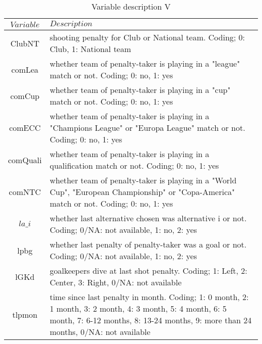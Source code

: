 \documentclass[12pt,dvipsnames]{article}%
\begin{document}
 \begin{table}[h]
\caption{Variable description \small{V}}
\centering
\begin{tabular}{ c | p{12cm}  }
    $Variable$ & $Description$   \\
   \hline 

 ClubNT & shooting penalty for Club or National team. Coding; 0: Club, 1: National team  \\

comLea & whether team of penalty-taker is playing in a "league" match or not. Coding; 0: no, 1: yes \\

comCup & whether team of penalty-taker is playing in a "cup" match or not. Coding; 0: no, 1: yes \\

comECC & whether team of penalty-taker is playing in a "Champions League" or "Europa League" match or not. Coding; 0: no, 1: yes \\

comQuali & whether team of penalty-taker is playing in a qualification match or not. Coding; 0: no, 1: yes \\

comNTC & whether team of penalty-taker is playing in a "World Cup", "European Championship" or "Copa-America" match or not. Coding; 0: no, 1: yes \\

$la\_i$ & whether last alternative chosen was alternative i or not. Coding; 0/NA: not available, 1: no, 2: yes  \\

lpbg & whether last penalty of penalty-taker was a goal or not. Coding; 0/NA: not available, 1: no, 2: yes \\

lGKd & goalkeepers dive at last shot penalty. Coding; 1: Left, 2: Center, 3: Right, 0/NA: not available \\

tlpmon & time since last penalty in month. Coding; 1: 0 month, 2: 1 month, 3: 2 month, 4: 3 month, 5: 4 month, 6: 5 month, 7: 6-12 months, 8: 13-24 months, 9: more than 24 months, 0/NA: not available\\


 \end{tabular}
 \end{table}
 
 \makeatletter
\setlength{\@fptop}{0pt}
\makeatother
 
\pagebreak
\end{document}
